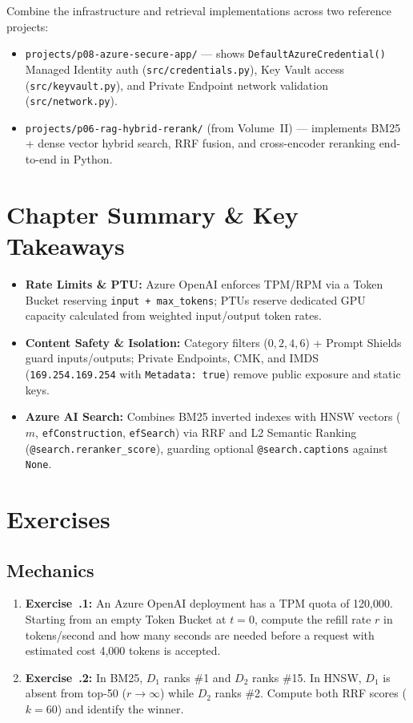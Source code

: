 \begin{labbridgebox}
Combine the infrastructure and retrieval implementations across two reference projects:
\begin{itemize}[leftmargin=12pt]
  \item \texttt{projects/p08-azure-secure-app/} --- shows \texttt{DefaultAzureCredential()} Managed Identity auth (\texttt{src/credentials.py}), Key Vault access (\texttt{src/keyvault.py}), and Private Endpoint network validation (\texttt{src/network.py}).
  \item \texttt{projects/p06-rag-hybrid-rerank/} (from Volume~II) --- implements BM25 + dense vector hybrid search, RRF fusion, and cross-encoder reranking end-to-end in Python.
\end{itemize}
\end{labbridgebox}

\section{Chapter Summary \protect\& Key Takeaways}
\begin{itemize}[leftmargin=15pt]
  \item \textbf{Rate Limits \& PTU:} Azure OpenAI enforces TPM/RPM via a Token Bucket reserving \texttt{input + max\_tokens}; PTUs reserve dedicated GPU capacity calculated from weighted input/output token rates.
  \item \textbf{Content Safety \& Isolation:} Category filters ($0,2,4,6$) + Prompt Shields guard inputs/outputs; Private Endpoints, CMK, and IMDS (\texttt{169.254.169.254} with \texttt{Metadata: true}) remove public exposure and static keys.
  \item \textbf{Azure AI Search:} Combines BM25 inverted indexes with HNSW vectors ($m$, \texttt{efConstruction}, \texttt{efSearch}) via RRF and L2 Semantic Ranking (\texttt{@search.reranker\_score}), guarding optional \texttt{@search.captions} against \texttt{None}.
\end{itemize}

\section{Exercises}

\subsection{Mechanics}
\begin{enumerate}[leftmargin=18pt]
  \item \textbf{Exercise~\thechapter.1:} An Azure OpenAI deployment has a TPM quota of 120,000. Starting from an empty Token Bucket at $t=0$, compute the refill rate $r$ in tokens/second and how many seconds are needed before a request with estimated cost 4,000 tokens is accepted.
  \item \textbf{Exercise~\thechapter.2:} In BM25, $D_1$ ranks \#1 and $D_2$ ranks \#15. In HNSW, $D_1$ is absent from top-50 ($r \to \infty$) while $D_2$ ranks \#2. Compute both RRF scores ($k=60$) and identify the winner.
\end{enumerate}

